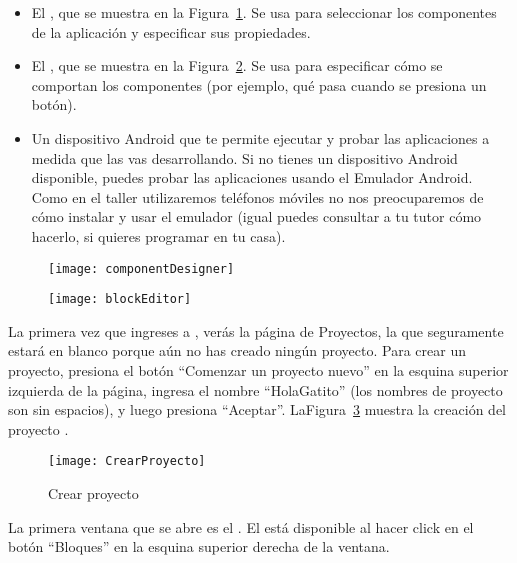 \begin{itemize}

\item El \componentDesigner, que se muestra en la Figura~\ref{fig:componentDesigner}. Se usa para seleccionar los componentes de la aplicación y especificar sus propiedades.

\item El \blockEditor, que se muestra en la Figura~\ref{fig:blockEditor}. Se usa para especificar cómo se comportan los componentes (por ejemplo, qué pasa cuando se presiona un botón).

\item Un dispositivo Android que te permite ejecutar y probar las aplicaciones a medida que las vas desarrollando. Si no tienes un dispositivo Android disponible, puedes probar las aplicaciones usando el Emulador Android. Como en el taller utilizaremos teléfonos móviles no nos preocuparemos de cómo instalar y usar el emulador (igual puedes consultar a tu tutor cómo hacerlo, si quieres programar en tu casa).

\end{itemize}

\begin{figure}[H]
  \centering
  \texttt{[image: componentDesigner]}
  \caption{\componentDesigner}
  \label{fig:componentDesigner}
\end{figure}

\begin{figure}[H]
  \centering
  \texttt{[image: blockEditor]}
  \caption{\blockEditor}
  \label{fig:blockEditor}
\end{figure}

La primera vez que ingreses a \aiurl, verás la página de Proyectos, la que seguramente estará en blanco porque aún no has creado ningún proyecto. Para crear un proyecto, presiona el botón ``Comenzar un proyecto nuevo'' en la esquina superior izquierda de la página, ingresa el nombre ``HolaGatito'' (los nombres de proyecto son sin
espacios), y luego presiona ``Aceptar''. LaFigura~\ref{fig:crearProyecto} muestra la creación del proyecto .

\begin{figure}[H]
  \centering
  \texttt{[image: CrearProyecto]}
  \caption{Crear proyecto }
  \label{fig:crearProyecto}
\end{figure}

La primera ventana que se abre es el \componentDesigner. El \blockEditor está disponible al hacer click en el botón ``Bloques'' en la esquina superior derecha de la ventana.


